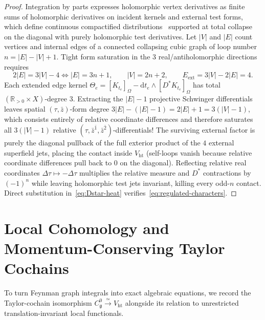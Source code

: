 \documentclass[11pt,letterpaper]{article}
\numberwithin{equation}{section}
\theoremstyle{plain}
\theoremstyle{definition}
\theoremstyle{remark}
\newcommand{\dd}{\mathrm{d}}
\newcommand{\fg}{\mathfrak{g}}
\newcommand{\Vht}{V_{\mathrm{ht}}}
\newcommand{\Cg}{C^0_{\fg}}
\begin{document}
\begin{proof}
Integration by parts expresses holomorphic vertex derivatives as finite sums of holomorphic derivatives on incident kernels and external test forms, which define continuous compactified distributions~\cite{WW} supported at total collapse on the diagonal with purely holomorphic test derivatives. Let $|V|$ and $|E|$ count vertices and internal edges of a connected collapsing cubic graph of loop number $n = |E|-|V|+1$. Tight form saturation in the $3$ real/antiholomorphic directions requires
\begin{equation}
\label{eq:tight-5d-count}
2|E| = 3|V| - 4 \iff |E| = 3n + 1, \qquad |V| = 2n + 2, \qquad E_{\mathrm{ext}} = 3|V| - 2|E| = 4.
\end{equation}
Each extended edge kernel $\Theta_e = [K_{t_e}]_\Omega - \dd t_e\wedge[D^* K_{t_e}]_\Omega$ has total $(\mathbb{R}_{>0}\times X)$-degree $3$. Extracting the $|E|-1$ projective Schwinger differentials leaves spatial $(\tau,\bar{z})$-form degree $3|E| - (|E|-1) = 2|E| + 1 = 3(|V|-1)$, which consists entirely of relative coordinate differences and therefore saturates all $3(|V|-1)$ relative $(\tau,\bar{z}^{\bar{1}},\bar{z}^{\bar{2}})$-differentials! The surviving external factor is purely the diagonal pullback of the full exterior product of the $4$ external superfield jets, placing the contact inside $\Vht$ (self-loops vanish because relative coordinate differences pull back to $0$ on the diagonal). Reflecting relative real coordinates $\Delta\tau \mapsto -\Delta\tau$ multiplies the relative measure and $D^*$ contractions by $(-1)^n$ while leaving holomorphic test jets invariant, killing every odd-$n$ contact. Direct substitution in~\eqref{eq:Dstar-heat} verifies~\eqref{eq:regulated-characters}.
\end{proof}

\section{Local Cohomology and Momentum-Conserving Taylor Cochains}
\label{sec:local-cohomology}

To turn Feynman graph integrals into exact algebraic equations, we record the Taylor-cochain isomorphism $\Cg \xrightarrow{\simeq} \Vht$ alongside its relation to unrestricted translation-invariant local functionals.
\end{document}
